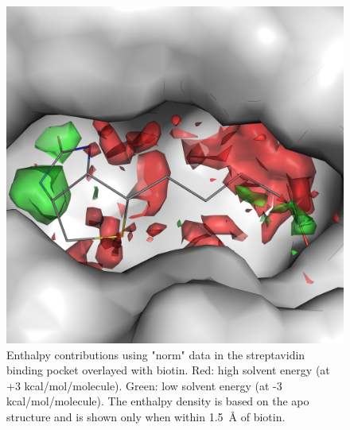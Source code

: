 \documentclass[9pt,tutorial]{livecoms}
\begin{document}
\begin{figure}
	\centering
	\includegraphics[width=0.8\linewidth]{figures/binding_pocket_norm_quants.png}
	\caption{Enthalpy contributions using "norm" data in the streptavidin binding pocket overlayed with biotin. Red: high solvent energy (at +3 
	kcal/mol/molecule). Green: low solvent energy (at -3 kcal/mol/molecule). The enthalpy density is based on the apo structure and is shown only when within \qty{1.5}{\angstrom} of biotin.}\label{fig_binding_pocket_pymol}
\end{figure}
\end{document}
